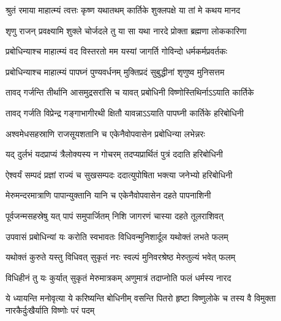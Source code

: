 \label{sec:padma-karttika-shukla-prabodhini}

\ganapatyadiDhyanam
\padmaPuranam



\twolineshloka
{श्रुतं रमाया माहात्म्यं त्वत्तः कृष्ण यथातथम्}
{कार्तिके शुक्लपक्षे या तां मे कथय मानद}%


\twolineshloka
{शृणु राजन् प्रवक्ष्यामि शुक्ले चोर्जदले तु या}
{सा यथा नारदे प्रोक्ता ब्रह्मणा लोककारिणा}%


\twolineshloka
{प्रबोधिन्याश्च माहात्म्यं वद विस्तरतो मम}
{यस्यां जागर्ति गोविन्दो धर्मकर्मप्रवर्तकः}%


\twolineshloka
{प्रबोधिन्याश्च माहात्म्यं पापघ्नं पुण्यवर्धनम्}
{मुक्तिप्रदं सुबुद्धीनां शृणुष्व मुनिसत्तम}%

\twolineshloka
{तावद् गर्जन्ति तीर्थानि आसमुद्रसरांसि च}
{यावत् प्रबोधिनी विष्णोस्तिथिर्नाऽऽयाति कार्तिके}%

\twolineshloka
{तावद् गर्जति विप्रेन्द्र गङ्गाभागीरथी क्षितौ}
{यावन्नाऽऽयाति पापघ्नी कार्तिके हरिबोधिनी}%

\twolineshloka
{अश्वमेधसहस्राणि राजसूयशतानि च}
{एकेनैवोपवासेन प्रबोधिन्या लभेन्नरः}%

\twolineshloka
{यद् दुर्लभं यदप्राप्यं त्रैलोक्यस्य न गोचरम्}
{तदप्यप्रार्थितं पुत्रं ददाति हरिबोधिनी}%

\twolineshloka
{ऐश्वर्यं सम्पदं प्रज्ञां राज्यं च सुखसम्पदः}
{ददात्युपोषिता भक्त्या जनेभ्यो हरिबोधिनी}%

\twolineshloka
{मेरुमन्दरमात्राणि पापान्युक्तानि यानि च}
{एकेनैवोपवासेन दहते पापनाशिनी}%

\twolineshloka
{पूर्वजन्मसहस्रेषु यत् पापं समुपार्जितम्}
{निशि जागरणं चास्या दहते तूलराशिवत्}%

\twolineshloka
{उपवासं प्रबोधिन्यां यः करोति स्वभावतः}
{विधिवन्मुनिशार्दूल यथोक्तं लभते फलम्}%

\twolineshloka
{यथोक्तं कुरुते यस्तु विधिवत् सुकृतं नरः}
{स्वल्पं मुनिवरश्रेष्ठ मेरुतुल्यं भवेत् फलम्}%

\twolineshloka
{विधिहीनं तु यः कुर्यात् सुकृतं मेरुमात्रकम्}
{अणुमात्रं तदाप्नोति फलं धर्मस्य नारद}%

\threelineshloka
{ये ध्यायन्ति मनोवृत्या ये करिष्यन्ति बोधिनीम्}
{वसन्ति पितरो हृष्टा विष्णुलोके च तस्य वै}%
{विमुक्ता नारकैर्दुःखैर्याति विष्णोः परं पदम्}

